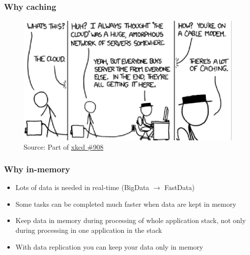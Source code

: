 \documentclass[10pt,utf8]{beamer}
\begin{document}
\begin{frame}
	\frametitle{Why caching}
	\begin{figure}
		\centering
		\includegraphics[width=12cm]{./img/xkcd_908.eps}
		\caption{\tiny{Source: Part of \href{http://xkcd.com/908/}{xkcd \#908}}}
	\end{figure}
\end{frame}

\begin{frame}
	\frametitle{Why in-memory}
	\begin{itemize}
	 \item Lots of data is needed in real-time (BigData $\rightarrow$ FastData)
	 \item Some tasks can be completed much faster when data are kept in memory
	 \item Keep data in memory during processing of whole application stack, not only during processing in one application in the stack
	 \item With data replication you can keep your data only in memory
	\end{itemize}
\end{frame}
\end{document}
